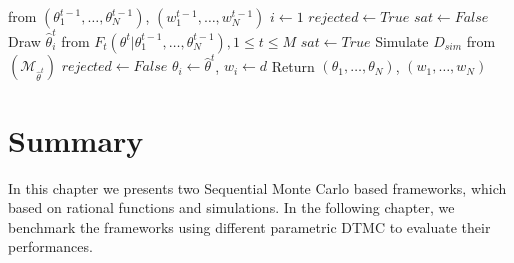 \begin{algorithm}[H]
\begin{algorithmic}[1]
            \hspace{3cm} from $(\theta^{t-1}_1,\ldots,\theta^{t-1}_N)$, $(w^{t-1}_1,\ldots,w^{t-1}_N)$  
            \State $i \leftarrow 1$
             
            \State $rejected \leftarrow True$
            \State $sat \leftarrow False $
            \State Draw $\hat{\theta}^t_i$ from $F_t(\theta^t | \theta^{t-1}_1,\ldots,\theta^{t-1}_N), 1\leq t \leq M$
            \State $sat \leftarrow True$
            \EndIf
            \EndWhile
            \State Simulate $D_{sim}$ from $(\mathcal{M}_{\hat{\theta}^t})$
            \State $rejected \leftarrow False$
            \State $\theta_i \leftarrow \hat{\theta}^t$, $w_i \leftarrow d$
            \EndIf
            \EndWhile
            \EndWhile
            \EndWhile
            \State Return $(\theta_1,\ldots,\theta_{N})$, $(w_1,\ldots,w_{N})$
            \EndProcedure
      \end{algorithmic}
\end{algorithm}

\section{Summary}
In this chapter we presents two Sequential Monte Carlo based frameworks, which based on rational
functions and simulations. In the following chapter, we benchmark the frameworks using different
parametric DTMC to evaluate their performances.
